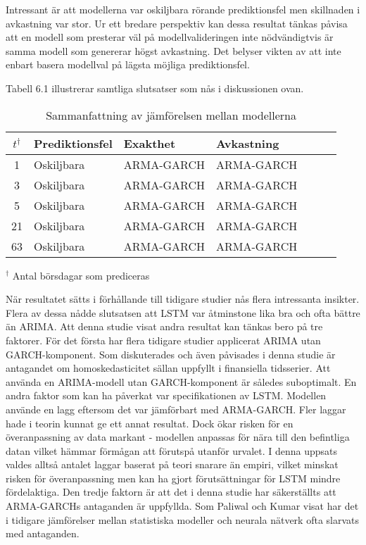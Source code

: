 \documentclass[11pt]{article}
\numberwithin{equation}{section}
\numberwithin{table}{section}
\numberwithin{figure}{section}
\begin{document}
Intressant är att modellerna var oskiljbara rörande prediktionsfel men skillnaden i avkastning var stor. Ur ett bredare perspektiv kan dessa resultat tänkas påvisa att en modell som presterar väl på modellvalideringen inte nödvändigtvis är samma modell som genererar högst avkastning. Det belyser vikten av att inte enbart basera modellval på lägsta möjliga prediktionsfel. 

Tabell 6.1 illustrerar samtliga slutsatser som nås i diskussionen ovan.

\begin{table}[H]
\caption{Sammanfattning av jämförelsen mellan modellerna}

\begin{tabularx}{\textwidth}{c *{6}{Y}}
\toprule
$t ^\dagger$  & Prediktionsfel & Exakthet & Avkastning \\
\hline

1      & Oskiljbara          & ARMA-GARCH                 & ARMA-GARCH          \\
3      & Oskiljbara          & ARMA-GARCH          & ARMA-GARCH    \\

5      & Oskiljbara          & ARMA-GARCH         &ARMA-GARCH   \\

21     &  Oskiljbara         & ARMA-GARCH         & ARMA-GARCH   \\


63     & Oskiljbara         & ARMA-GARCH         & ARMA-GARCH    \\ 

\bottomrule
\end{tabularx}
\footnotesize{$^\dagger$ Antal börsdagar som prediceras}
\end{table}

När resultatet sätts i förhållande till tidigare studier nås flera intressanta insikter. Flera av dessa nådde slutsatsen att LSTM var åtminstone lika bra och ofta bättre än ARIMA. Att denna studie visat andra resultat kan tänkas bero på tre faktorer. För det första har flera tidigare studier applicerat ARIMA utan GARCH-komponent. Som diskuterades och även påvisades i denna studie är antagandet om homoskedasticitet sällan uppfyllt i finansiella tidsserier. Att använda en ARIMA-modell utan GARCH-komponent är således suboptimalt. En andra faktor som kan ha påverkat var specifikationen av LSTM. Modellen använde en lagg eftersom det var jämförbart med ARMA-GARCH. Fler laggar hade i teorin kunnat ge ett annat resultat. Dock ökar risken för en överanpassning av data markant -  modellen anpassas för nära till den befintliga datan vilket hämmar förmågan att förutspå utanför urvalet. I denna uppsats valdes alltså antalet laggar baserat på teori snarare än empiri, vilket minskat risken för överanpassning men kan ha gjort förutsättningar för LSTM mindre fördelaktiga. Den tredje faktorn är att det i denna studie har säkerställts att ARMA-GARCHs antaganden är uppfyllda. Som Paliwal och Kumar \parencite*{paliwal2009neural} visat har det i tidigare jämförelser mellan statistiska modeller och neurala nätverk ofta slarvats med antaganden. 
\end{document}
